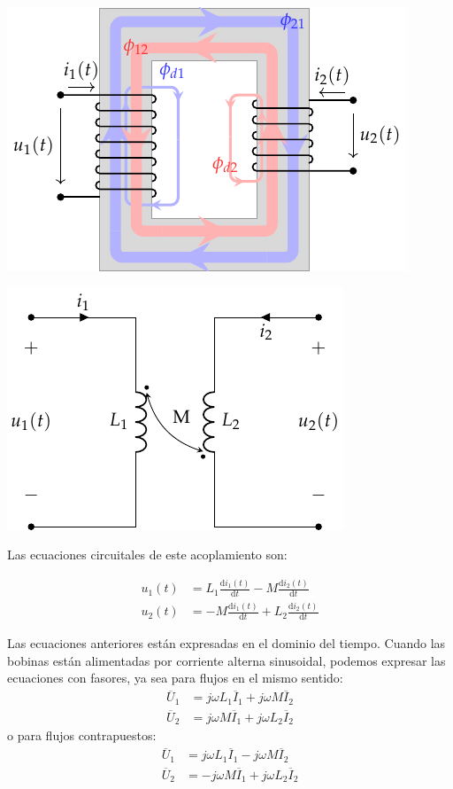 \begin{center}
  \includegraphics[height=0.2\textheight]{../figs/acoplamientoTikz_opuesto.pdf}
\end{center}
\begin{center}
  \includegraphics[height=0.2\textheight]{../figs/acoplamiento_circuito_opuesto.pdf}
\end{center}

Las ecuaciones circuitales de este acoplamiento son:

\begin{align*}
  u_1(t) &= L_1 \frac{\mathrm{d}i_1(t)}{\mathrm{d}t} - M \frac{\mathrm{d}i_2(t)}{\mathrm{d}t}\\
  u_2(t) &= - M \frac{\mathrm{d}i_1(t)}{\mathrm{d}t} + L_2 \frac{\mathrm{d}i_2(t)}{\mathrm{d}t}
\end{align*}

Las ecuaciones anteriores están expresadas en el dominio del
tiempo. Cuando las bobinas están alimentadas por corriente alterna
sinusoidal, podemos expresar las ecuaciones con fasores, ya sea para
flujos en el mismo sentido:
\begin{align*}
  \overline{U}_1 &= j \omega L_1 \overline{I}_1 + j \omega M \overline{I}_2\\
  \overline{U}_2 &= j \omega M \overline{I}_1 + j \omega L_2 \overline{I}_2
\end{align*}
o para flujos contrapuestos:
\begin{align*}
  \overline{U}_1 &= j \omega L_1 \overline{I}_1 - j \omega M \overline{I}_2\\
  \overline{U}_2 &= - j \omega M \overline{I}_1 + j \omega L_2 \overline{I}_2
\end{align*}


